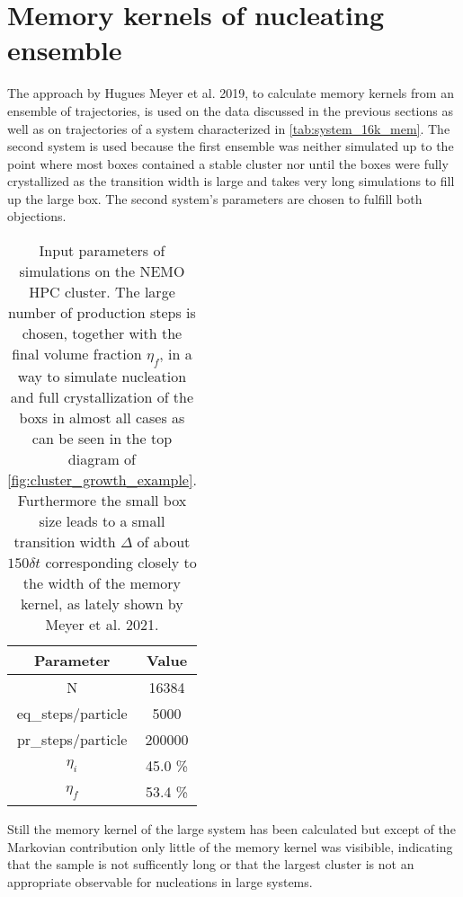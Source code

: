 \section{Memory kernels of nucleating ensemble}
\label{sec:memory_kernels}
The approach by Hugues Meyer et al. 2019\cite{Meyer2019a}, to calculate memory kernels from an ensemble of trajectories, is used on the data discussed in the previous sections as well as on trajectories of a system characterized in \autoref{tab:system_16k_mem}. The second system is used because the first ensemble was neither simulated up to the point where most boxes contained a stable cluster nor until the boxes were fully crystallized as the transition width is large and takes very long simulations to fill up the large box. The second system's parameters are chosen to fulfill both objections.\\

\begin{table}[ht]
\centering
\begin{tabular}{c|c}
Parameter & Value \\ \hline
N & 16384 \\
eq\_steps/particle & 5000 \\
pr\_steps/particle & 200000 \\
$\eta_i$ & 45.0 \% \\
$\eta_f$ & 53.4 \% \\
\end{tabular}
\caption[Simulation parameters of data production system with 16384 particles]{Input parameters of simulations on the NEMO HPC cluster. The large number of production steps is chosen, together with the final volume fraction $\eta_f$, in a way to simulate nucleation and full crystallization of the boxs in almost all cases as can be seen in the top diagram of \autoref{fig:cluster_growth_example}. Furthermore the small box size leads to a small transition width $\Delta$ of about $150 \delta t$ corresponding closely to the width of the memory kernel, as lately shown by Meyer et al. 2021\cite{Meyer2021}.} 
\label{tab:system_16k_mem}
\end{table}

Still the memory kernel of the large system has been calculated but except of the Markovian contribution only little of the memory kernel was visibible, indicating that the sample is not sufficently long or that the largest cluster is not an appropriate observable for nucleations in large systems.\\

